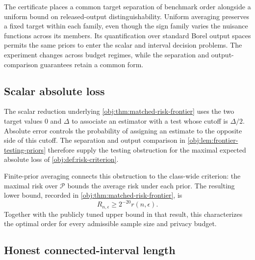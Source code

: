 
The certificate places a common target separation of benchmark order alongside a uniform bound on released-output distinguishability. Uniform averaging preserves a fixed target within each family, even though the sign family varies the nuisance functions across its members. Its quantification over standard Borel output spaces permits the same priors to enter the scalar and interval decision problems. The experiment changes across budget regimes, while the separation and output-comparison guarantees retain a common form.

\subsection{Scalar absolute loss}

The scalar reduction underlying \cref{obj:thm:matched-risk-frontier} uses the two target values \(0\) and \(\Delta\) to associate an estimator with a test whose cutoff is \(\Delta/2\). Absolute error controls the probability of assigning an estimate to the opposite side of this cutoff. The separation and output comparison in \cref{obj:lem:frontier-testing-priors} therefore supply the testing obstruction for the maximal expected absolute loss of \cref{obj:def:risk-criterion}.

Finite-prior averaging connects this obstruction to the class-wide criterion: the maximal risk over \(\mathcal P\) bounds the average risk under each prior. The resulting lower bound, recorded in \cref{obj:thm:matched-risk-frontier}, is
\[
R_{n,\epsilon}\ge2^{-20}r(n,\epsilon).
\]
Together with the publicly tuned upper bound in that result, this characterizes the optimal order for every admissible sample size and privacy budget.

\subsection{Honest connected-interval length}

